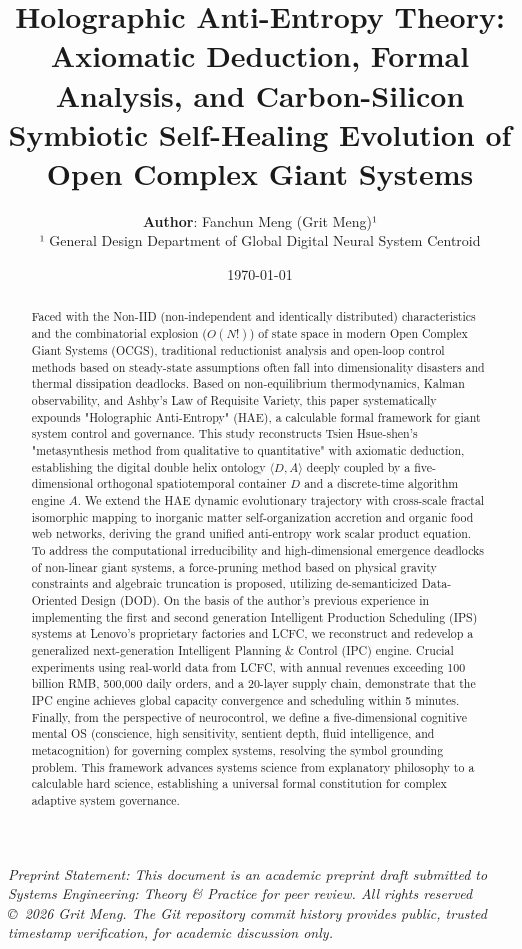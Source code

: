 \documentclass[11pt,a4paper]{article}
\title{\textbf{Holographic Anti-Entropy Theory: Axiomatic Deduction, Formal Analysis, and Carbon-Silicon Symbiotic Self-Healing Evolution of Open Complex Giant Systems}}
\author{\textbf{Author}: Fanchun Meng (Grit Meng)¹ \\ \small ¹ General Design Department of Global Digital Neural System Centroid}
\date{\today}
\begin{document}
\maketitle

\begin{center}
\small\itshape
Preprint Statement: This document is an academic preprint draft submitted to \emph{Systems Engineering: Theory \& Practice} for peer review. All rights reserved \copyright\ 2026 Grit Meng. The Git repository commit history provides public, trusted timestamp verification, for academic discussion only.
\end{center}
\vspace{1em}

\begin{abstract}
Faced with the Non-IID (non-independent and identically distributed) characteristics and the combinatorial explosion ($O(N!)$) of state space in modern Open Complex Giant Systems (OCGS), traditional reductionist analysis and open-loop control methods based on steady-state assumptions often fall into dimensionality disasters and thermal dissipation deadlocks. Based on non-equilibrium thermodynamics, Kalman observability, and Ashby's Law of Requisite Variety, this paper systematically expounds "Holographic Anti-Entropy" (HAE), a calculable formal framework for giant system control and governance. This study reconstructs Tsien Hsue-shen's "metasynthesis method from qualitative to quantitative" with axiomatic deduction, establishing the digital double helix ontology $\langle D, A \rangle$ deeply coupled by a five-dimensional orthogonal spatiotemporal container $D$ and a discrete-time algorithm engine $A$. We extend the HAE dynamic evolutionary trajectory with cross-scale fractal isomorphic mapping to inorganic matter self-organization accretion and organic food web networks, deriving the grand unified anti-entropy work scalar product equation. To address the computational irreducibility and high-dimensional emergence deadlocks of non-linear giant systems, a force-pruning method based on physical gravity constraints and algebraic truncation is proposed, utilizing de-semanticized Data-Oriented Design (DOD). On the basis of the author's previous experience in implementing the first and second generation Intelligent Production Scheduling (IPS) systems at Lenovo's proprietary factories and LCFC, we reconstruct and redevelop a generalized next-generation Intelligent Planning \& Control (IPC) engine. Crucial experiments using real-world data from LCFC, with annual revenues exceeding 100 billion RMB, 500,000 daily orders, and a 20-layer supply chain, demonstrate that the IPC engine achieves global capacity convergence and scheduling within 5 minutes. Finally, from the perspective of neurocontrol, we define a five-dimensional cognitive mental OS (conscience, high sensitivity, sentient depth, fluid intelligence, and metacognition) for governing complex systems, resolving the symbol grounding problem. This framework advances systems science from explanatory philosophy to a calculable hard science, establishing a universal formal constitution for complex adaptive system governance.
\end{abstract}
\end{document}
